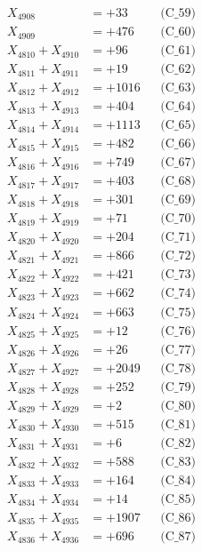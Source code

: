 \documentclass[a4paper,10pt]{article}
\begin{document}
{\begin{align}
X_{4908} &= +33 && \text{(C\_59)} \\
X_{4909} &= +476 && \text{(C\_60)} \\
\allowbreak
X_{4810} + X_{4910} &= +96 && \text{(C\_61)} \\
X_{4811} + X_{4911} &= +19 && \text{(C\_62)} \\
X_{4812} + X_{4912} &= +1016 && \text{(C\_63)} \\
X_{4813} + X_{4913} &= +404 && \text{(C\_64)} \\
X_{4814} + X_{4914} &= +1113 && \text{(C\_65)} \\
\allowbreak
X_{4815} + X_{4915} &= +482 && \text{(C\_66)} \\
X_{4816} + X_{4916} &= +749 && \text{(C\_67)} \\
X_{4817} + X_{4917} &= +403 && \text{(C\_68)} \\
X_{4818} + X_{4918} &= +301 && \text{(C\_69)} \\
X_{4819} + X_{4919} &= +71 && \text{(C\_70)} \\
\allowbreak
X_{4820} + X_{4920} &= +204 && \text{(C\_71)} \\
X_{4821} + X_{4921} &= +866 && \text{(C\_72)} \\
X_{4822} + X_{4922} &= +421 && \text{(C\_73)} \\
X_{4823} + X_{4923} &= +662 && \text{(C\_74)} \\
X_{4824} + X_{4924} &= +663 && \text{(C\_75)} \\
\allowbreak
X_{4825} + X_{4925} &= +12 && \text{(C\_76)} \\
X_{4826} + X_{4926} &= +26 && \text{(C\_77)} \\
X_{4827} + X_{4927} &= +2049 && \text{(C\_78)} \\
X_{4828} + X_{4928} &= +252 && \text{(C\_79)} \\
X_{4829} + X_{4929} &= +2 && \text{(C\_80)} \\
\allowbreak
X_{4830} + X_{4930} &= +515 && \text{(C\_81)} \\
X_{4831} + X_{4931} &= +6 && \text{(C\_82)} \\
X_{4832} + X_{4932} &= +588 && \text{(C\_83)} \\
X_{4833} + X_{4933} &= +164 && \text{(C\_84)} \\
X_{4834} + X_{4934} &= +14 && \text{(C\_85)} \\
\allowbreak
X_{4835} + X_{4935} &= +1907 && \text{(C\_86)} \\
X_{4836} + X_{4936} &= +696 && \text{(C\_87)} \\

\end{align}}
\end{document}

